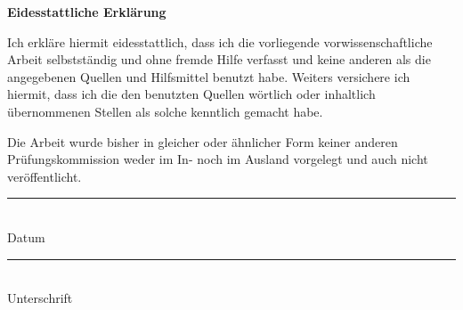 \newpage %
\thispagestyle{empty} %

\begin{center}
	\Large\textbf{Eidesstattliche Erklärung}
\end{center}

\vspace{1cm} %

\normalsize
Ich erkläre hiermit eidesstattlich, dass ich die vorliegende vorwissenschaftliche Arbeit selbstständig und ohne fremde Hilfe verfasst und keine anderen als die angegebenen Quellen und Hilfsmittel benutzt habe. Weiters versichere ich hiermit, dass ich die den benutzten Quellen wörtlich oder inhaltlich übernommenen Stellen als solche kenntlich gemacht habe.

Die Arbeit wurde bisher in gleicher oder ähnlicher Form keiner anderen Prüfungskommission weder im In- noch im Ausland vorgelegt und auch nicht veröffentlicht.

\vspace{2cm} %

\begin{minipage}{0.5\textwidth}
	\begin{flushleft}
		\rule{6cm}{0.4pt}\\
		Datum
	\end{flushleft}
\end{minipage}%
\begin{minipage}{0.5\textwidth}
	\begin{flushright}
		\rule{6cm}{0.4pt}\\
		Unterschrift
	\end{flushright}
\end{minipage}
\newpage %

